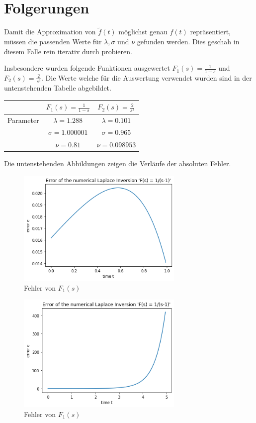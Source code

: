 \documentclass{scrartcl}
\begin{document}
\section{Folgerungen
\label{laplace:section:folgerungen}}
Damit die Approximation von $\tilde{f}(t)$ möglichst genau $f(t)$ repräsentiert, müssen die passenden Werte für $\lambda, \sigma $ und $\nu $ gefunden werden. 
Dies geschah in diesem Falle rein iterativ durch probieren.

Insbesondere wurden folgende Funktionen ausgewertet $ F_{1}(s)=\frac{1}{1-s} $ und $F_{2}(s) = \frac{2}{s^{3}}$. 
Die Werte welche für die Auswertung verwendet wurden sind in der untenstehenden Tabelle abgebildet.

\begin{center}
\begin{tabular}[c]{c|c|c}
& $F_{1}(s)=\frac{1}{1-s}$ & $F_{2}(s) = \frac{2}{s^{3}}$ \\
\hline
Parameter & $\lambda=1.288$ & $\lambda=0.101$ \\
& $\sigma=1.000001$ & $\sigma=0.965$ \\
& $\nu=0.81$ & $\nu=0.098953$ \\
\end{tabular}
\end{center}
Die untenstehenden Abbildungen zeigen die Verläufe der absoluten Fehler.

\begin{figure}[h]
\begin{center}
\includegraphics[width=8cm]{"Error_1divide_sminus1"}
\caption{Fehler von $F_{1}(s)$}
\end{center}
\end{figure}

\begin{figure}[h]
\begin{center}
\includegraphics[width=8cm]{"Error_1divide_sminus1_bis_tgleich5"}
\caption{Fehler von $F_{1}(s)$}
\end{center}
\end{figure}
\end{document}
